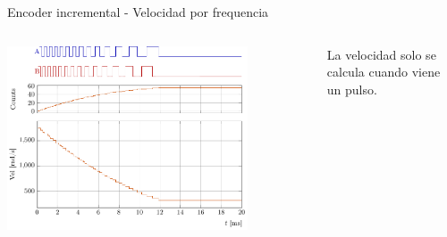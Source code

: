\documentclass[presentation,aspectratio=169]{beamer}
\begin{document}
\begin{frame}[label={sec:org7d9020f}]{Encoder incremental - Velocidad por frequencia}
\begin{columns}
\begin{column}{0.7\columnwidth}
\begin{center}
\includegraphics[width=0.8\textwidth]{../../figures/encoder-signal-freqs2}
\end{center}
\end{column}

\begin{column}{0.3\columnwidth}
La velocidad solo se calcula cuando viene un pulso.
\end{column}
\end{columns}
\end{frame}
\end{document}
